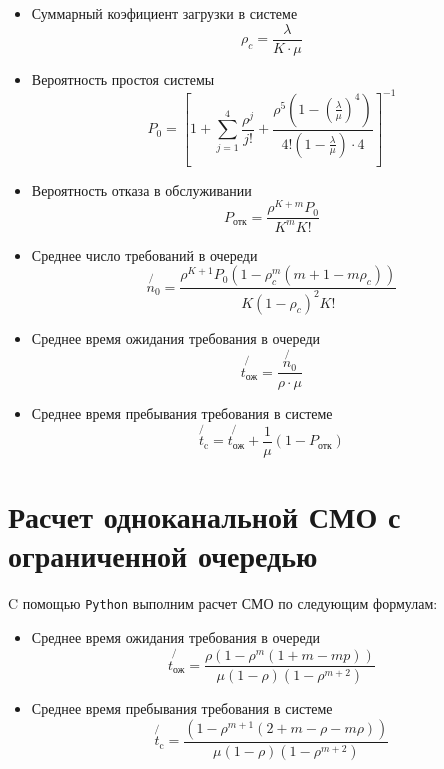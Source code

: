 \begin{itemize}
	\item Суммарный коэфициент загрузки в системе \begin{equation*}
		\rho_c = \frac{\lambda}{K \cdot \mu}
	\end{equation*}
	\item Вероятность простоя системы \begin{equation*}
		P_0 = \left[ 1 + \sum_{j = 1}^4 \frac{\rho^j}{j!} + \frac{\rho^5 (1 - (\frac{\lambda}{\mu})^4)}{4!(1 - \frac{\lambda}{\mu}) \cdot 4} \right]^{-1}
	\end{equation*}
	\item Вероятность отказа в обслуживании \begin{equation*}
		P_\text{отк} = \frac{\rho^{K + m} P_0}{K^mK!}
	\end{equation*}
	\item Среднее число требований в очереди \begin{equation*}
		\not{n_0} = \frac{\rho^{K+1}P_0(1 - \rho_c^m(m + 1 - m\rho_c))}{K(1-\rho_c)^2K!}
	\end{equation*}
	\item Среднее время ожидания требования в очереди \begin{equation*}
		\not{t_\text{ож}} = \frac{\not{n_0}}{\rho \cdot \mu}
	\end{equation*}
	\item Среднее время пребывания требования в системе \begin{equation*}
		\not{t_\text{c}} = \not{t_\text{ож}} + \frac{1}{\mu}(1 - P_\text{отк})
	\end{equation*}
\end{itemize}

\section{Расчет одноканальной СМО с ограниченной очередью}

C помощью \verb+Python+ выполним расчет СМО по следующим формулам:

\begin{itemize}
	\item Среднее время ожидания требования в очереди \begin{equation*}
		\not{t_\text{ож}} = \frac{\rho (1-\rho^m(1+m-mp))}{\mu (1-\rho)(1-\rho^{m+2})}
	\end{equation*}
	\item Среднее время пребывания требования в системе \begin{equation*}
		\not{t_\text{c}} = \frac{(1-\rho^{m+1}(2+m-\rho-m\rho))}{\mu(1-\rho)(1-\rho^{m+2})}
	\end{equation*}
\end{itemize}

